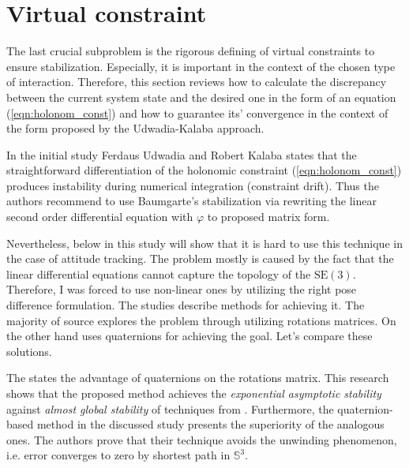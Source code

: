 \section{Virtual constraint} \label{sec:virtual_constraint}


The last crucial subproblem is the rigorous defining of virtual constraints to ensure
stabilization. Especially, it is important in the context of the chosen type of
interaction. Therefore, this section reviews how to calculate the discrepancy
between the current system state and the desired one in the form of an equation
(\ref{eqn:holonom_const}) and how to guarantee its' convergence in the
context of the form proposed by the Udwadia-Kalaba approach.


In the initial \cite{UdwadiaKalabaApproach} study Ferdaus Udwadia and Robert
Kalaba states that the straightforward differentiation of the holonomic
constraint (\ref{eqn:holonom_const}) produces instability during numerical
integration (constraint drift). Thus the authors recommend to use
Baumgarte's stabilization \cite{BaumgarteStab} via rewriting the linear second
order differential equation with $\varphi$ to proposed matrix form.


Nevertheless, below in this study will show that it is hard to use
this technique in the case of attitude tracking. The problem mostly
is caused by the fact that the linear differential equations cannot
capture the topology of the $\text{SE}(3)$. Therefore, I was forced
to use non-linear ones by utilizing the right pose difference formulation.
The studies \cite{SlidingOnManifoldsQuat,GeomControlQuadSE3,
RigidBodyAttCon,OutFeedbackStabForOrbRob,ANonlinearObserverUsingPose}
describe methods for achieving it. The majority \cite{GeomControlQuadSE3,
RigidBodyAttCon,OutFeedbackStabForOrbRob,ANonlinearObserverUsingPose} of
source explores the problem through utilizing rotations matrices. On the other hand
\cite{SlidingOnManifoldsQuat} uses quaternions for achieving the goal.
Let's compare these solutions.


The \cite{SlidingOnManifoldsQuat} states the advantage of quaternions on
the rotations matrix. This research shows that the proposed method achieves
the \emph{exponential asymptotic stability} against \emph{almost global
stability} of techniques from \cite{GeomControlQuadSE3,RigidBodyAttCon}.
Furthermore, the quaternion-based method in the discussed study presents the
superiority of the analogous ones. The authors prove that their technique
avoids the unwinding phenomenon, i.e. error converges to zero by shortest
path in $\mathbb{S}^3$.



